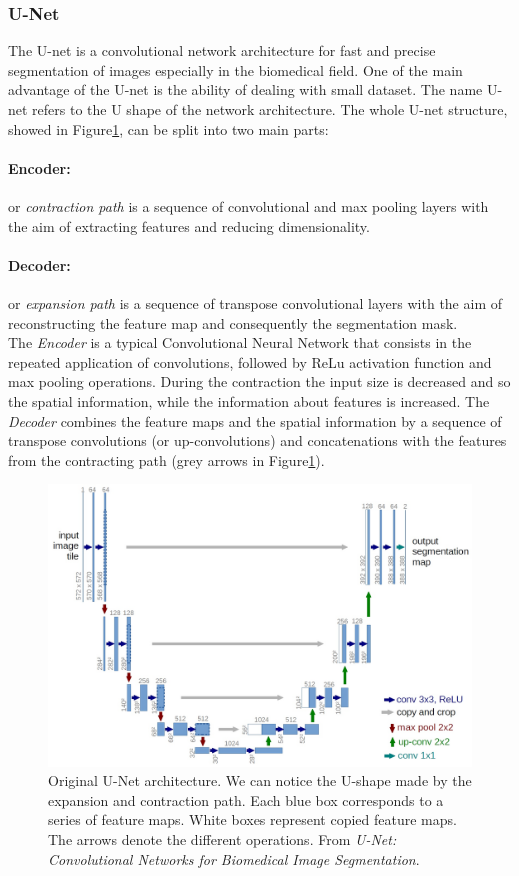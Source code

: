 \documentclass{standalone}
\begin{document}
\subsubsection{U-Net}
The U-net is a convolutional network architecture for fast and precise segmentation of images especially in the biomedical field\cite{unet}.
One of the main advantage of the U-net is the ability of dealing with small dataset. 
The name U-net refers to the U shape of the network architecture. 
The whole U-net structure, showed in Figure\ref{fig:unet}, can be split into two main parts:

\paragraph{Encoder:}
or \textit{contraction path} is a sequence of convolutional and max pooling layers with the aim of extracting features and reducing dimensionality.

\paragraph{Decoder:}
or \textit{expansion path} is a sequence of transpose convolutional layers with the aim of reconstructing the feature map and consequently the segmentation mask.
\\
The \textit{Encoder} is a typical Convolutional Neural Network that consists in the repeated application of convolutions, followed by ReLu activation function and max pooling operations.
During the contraction the input size is decreased and so the spatial information, while the information about features is increased.
The \textit{Decoder} combines the feature maps and the spatial information by a sequence of transpose convolutions (or up-convolutions) and concatenations with the features from the contracting path (grey arrows in Figure\ref{fig:unet}).
\begin{figure}[ht]

    \centering
    \includegraphics[width=.85\textwidth]{../images/U-Net arch.jpeg}
    
    \caption{Original U-Net architecture. We can notice the U-shape made by the expansion and contraction path. Each blue box corresponds to a series of feature maps. White boxes represent copied feature maps. The arrows denote the different operations. From \textit{U-Net: Convolutional Networks for Biomedical Image Segmentation}\cite{unet}.}
    \label{fig:unet}
    
    \end{figure}
\end{document}

